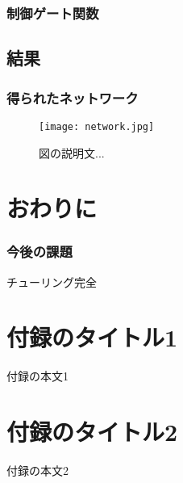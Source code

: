 \documentclass[exploratorypaper]{jsaiart} %
\begin{document}
\subsubsection{制御ゲート関数}
\subsection{結果}
\subsubsection{得られたネットワーク}

\begin{figure*}[t]
    \begin{center}
        \texttt{[image: network.jpg]}
    \end{center}
    \capwidth=90mm %
    \caption{図の説明文... }
\end{figure*}

\section{おわりに}
\subsubsection{今後の課題}
チューリング完全




\appendix

\section{付録のタイトル1}

付録の本文1

\section{付録のタイトル2}

付録の本文2

\begin{biography}
\end{biography}
\end{document}
